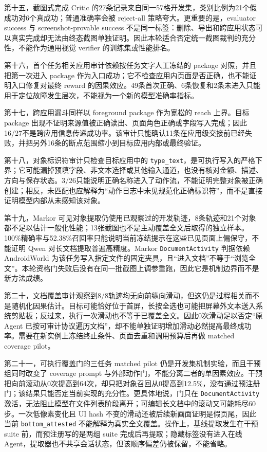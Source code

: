 \documentclass[12pt,a4paper]{ctexart}
\newcommand{\code}[1]{\texttt{#1}}
\begin{document}
第十五，截图式完成 Critic 的27条记录来自同一57格开发集，类别比例为21个假成功对6个真成功；普通准确率会被 reject-all 策略夸大。更重要的是，evaluator success 与 screenshot-provable success 不是同一标签：删除、导出和跨应用状态可以真实完成却无法由终态截图单独证明。因此本轮适合否定统一截图裁判的充分性，不能作为通用视觉 verifier 的训练集或性能排名。

第十六，首个任务相关应用审计依赖按任务文字人工冻结的 package 对照，并且把第一次进入 package 作为入口成功；它不检查应用内页面是否正确，也不能证明入口修复对最终 reward 的因果效应。49条首次正确、6条恢复和2条未进入只能用于定位故障发生层次，不能视为一个新的模型准确率指标。

第十七，跨应用漏斗同样以 foreground package 作为宽松的 reach 上界。目标 package 出现不证明来源值被正确读出、页面角色正确或字段写入完成；因此16/27不是跨应用信息传递成功率。该审计只能确认11条在应用级交接前已经失败，并把另外16条的断点范围缩小到目标应用内部或最终验证。

第十八，对象标识符审计只检查目标应用中的 \code{type\_text}，是可执行写入的严格下界；它可能漏掉预填字段、非文本选择或其他输入通道，也没有核对金额、描述、方向与保存状态。3/26只能说明正确名称进入了动作流，不能证明完整对象被正确创建；相反，未匹配也应解释为“动作日志中未见规范化正确标识符”，而不是直接证明模型内部从未感知该对象。

第十九，Markor 可见对象提取仍使用已观察过的开发轨迹，8条轨迹和21个对象都不足以估计一般化性能；13张截图也不是主动覆盖全文后取得的独立样本。100\%精确率与52.38\%召回率只能说明当前冻结提示在这些已见页面上偏保守，不能证明 Qwen 对长文档提取普遍高精度。Markor \code{DocumentActivity} 判据依赖 AndroidWorld 为该任务写入指定文件的固定夹具，且“进入文档”不等于“浏览全文”。本轮资格门失败后没有在同一批截图上调参重跑，因此它是机制边界而不是新方法成绩。

第二十，文档覆盖审计观察到8/8轨迹均无向前纵向滑动，但这仍是过程相关而不是随机化因果估计。目标可能恰好位于首屏，长按全选也可能把屏幕外文本送入系统剪贴板；反过来，执行一次滑动也不等于已覆盖全文。因此0次滑动足以否定“原 Agent 已按可审计协议遍历文档”，却不能单独证明增加滑动必然提高最终成功率。需要在新实例上冻结终止条件、页面去重和调用预算后再做 matched coverage pilot。

第二十一，可执行覆盖门的三任务 matched pilot 仍是开发集机制实验，而且干预组同时改变了 coverage prompt 与外部动作门，不能分离二者的单因素效应。干预把向前滚动从0次提高到64次，却只把对象召回从0提高到12.5\%，没有通过预注册门；该结果只能否定当前实现的充分性。更具体地说，门只在 \code{DocumentActivity} 激活，无法阻止模型在文件列表阶段离开；可编辑长文档中的滚动又可能耗尽60步。一次低像素变化且 UI hash 不变的滑动还被后续新画面证明是假页尾，因此当前 \code{bottom\_attested} 不能解释为真实全文覆盖。操作上，基线提取发生在干预 suite 前，而预注册写的是两组 suite 完成后再提取；隐藏标签没有进入在线 Agent，提取器也不共享会话状态，但该顺序偏差仍被保留，不能省略。
\end{document}
